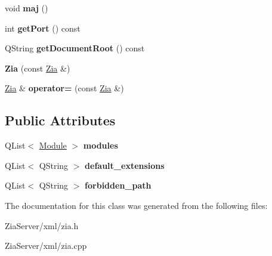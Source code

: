 \begin{DoxyCompactItemize}
\item 
\hypertarget{class_zia_a08ee5e637cb97e9634b4a063aaea3627}{
void {\bfseries maj} ()}
\label{class_zia_a08ee5e637cb97e9634b4a063aaea3627}

\item 
\hypertarget{class_zia_a59e7342ba3a2727f812b0c847dca3bb4}{
int {\bfseries getPort} () const }
\label{class_zia_a59e7342ba3a2727f812b0c847dca3bb4}

\item 
\hypertarget{class_zia_a4922ff8a1f60db1460d4e901c9a2f576}{
QString {\bfseries getDocumentRoot} () const }
\label{class_zia_a4922ff8a1f60db1460d4e901c9a2f576}

\item 
\hypertarget{class_zia_a620d83f267fc11dba5aab9f90b175430}{
{\bfseries Zia} (const \hyperlink{class_zia}{Zia} \&)}
\label{class_zia_a620d83f267fc11dba5aab9f90b175430}

\item 
\hypertarget{class_zia_aa906c7502690cc20c41de8d57e9f2d62}{
\hyperlink{class_zia}{Zia} \& {\bfseries operator=} (const \hyperlink{class_zia}{Zia} \&)}
\label{class_zia_aa906c7502690cc20c41de8d57e9f2d62}

\end{DoxyCompactItemize}
\subsection*{Public Attributes}
\begin{DoxyCompactItemize}
\item 
\hypertarget{class_zia_ae720605acc85e38462fc027a901aacd6}{
QList$<$ \hyperlink{class_module}{Module} $>$ {\bfseries modules}}
\label{class_zia_ae720605acc85e38462fc027a901aacd6}

\item 
\hypertarget{class_zia_a908b0f461f5904d15cf89fd0d527d69b}{
QList$<$ QString $>$ {\bfseries default\_\-extensions}}
\label{class_zia_a908b0f461f5904d15cf89fd0d527d69b}

\item 
\hypertarget{class_zia_ae7d7142801576c6098205d9ebb90f2a5}{
QList$<$ QString $>$ {\bfseries forbidden\_\-path}}
\label{class_zia_ae7d7142801576c6098205d9ebb90f2a5}

\end{DoxyCompactItemize}


The documentation for this class was generated from the following files:\begin{DoxyCompactItemize}
\item 
ZiaServer/xml/zia.h\item 
ZiaServer/xml/zia.cpp\end{DoxyCompactItemize}
